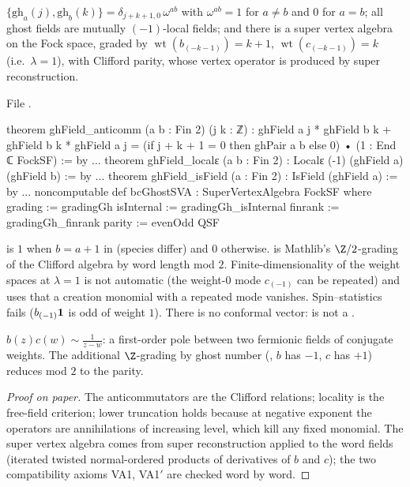 \begin{theorem}\label{l17:thm:bc}
$\{\mathrm{gh}_a(j),\mathrm{gh}_b(k)\}=\delta_{j+k+1,0}\,\omega^{ab}$ with $\omega^{ab}=1$ for $a\neq b$
and $0$ for $a=b$; all ghost fields are mutually $(-1)$-local fields; and there is a super vertex algebra
 on the Fock space, graded by $\operatorname{wt}(b_{(-k-1)})=k+1$,
$\operatorname{wt}(c_{(-k-1)})=k$ (i.e.\ $\lambda=1$), with Clifford parity, whose vertex operator is
produced by super reconstruction.
\end{theorem}
\noindent File .
\begin{leancode}
theorem ghField_anticomm (a b : Fin 2) (j k : ℤ) :
    ghField a j * ghField b k + ghField b k * ghField a j
      = (if j + k + 1 = 0 then ghPair a b else 0) • (1 : End ℂ FockSF) := by
...
theorem ghField_localε (a b : Fin 2) : Localε (-1) (ghField a) (ghField b) := by
...
theorem ghField_isField (a : Fin 2) : IsField (ghField a) := by
...
noncomputable def bcGhostSVA : SuperVertexAlgebra FockSF where
  grading := gradingGh
  isInternal := gradingGh_isInternal
  finrank := gradingGh_finrank
  parity := evenOdd QSF
\end{leancode}
\begin{dictionary}
 is $1$ when $b=a+1$ in  (species differ) and $0$ otherwise.
 is Mathlib's $\Z/2$-grading of the Clifford algebra by word length mod $2$.
Finite-dimensionality of the weight spaces at $\lambda=1$ is not automatic (the weight-$0$ mode $c_{(-1)}$
can be repeated) and uses that a creation monomial with a repeated mode vanishes. Spin--statistics
fails ($b_{(-1)}\mathbf{1}$ is odd of weight $1$). There is no conformal vector: 
is not a .
\end{dictionary}
\begin{physics}
$b(z)c(w)\sim\frac1{z-w}$: a first-order pole between two fermionic fields of conjugate weights. The
additional $\Z$-grading by ghost number (, $b$ has $-1$, $c$ has $+1$) reduces mod $2$
to the parity.
\end{physics}
\begin{proof}[Proof on paper]
The anticommutators are the Clifford relations; locality is the free-field criterion; lower
truncation holds because at negative exponent the operators are annihilations of increasing level,
which kill any fixed monomial. The super vertex algebra comes from super reconstruction applied to
the word fields (iterated twisted normal-ordered products of derivatives of $b$ and $c$); the two
compatibility axioms VA1, VA1$'$ are checked word by word.
\end{proof}
